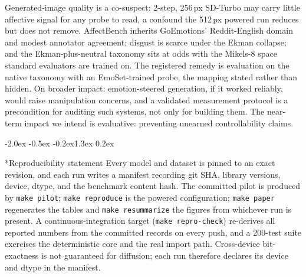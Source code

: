 \documentclass[10pt]{article}
\makeatletter
\renewcommand\section{\@startsection{section}{1}{\z@}%
  {-2.0ex \@plus -0.5ex \@minus -0.2ex}{1.3ex \@plus 0.2ex}{\large\bfseries\raggedright}}
\makeatother
\begin{document}
Generated-image quality is a co-suspect: 2-step, 256\,px SD-Turbo may carry little affective signal for any probe to read, a confound the 512\,px powered run reduces but does not remove. AffectBench inherits GoEmotions' Reddit-English domain and modest annotator agreement; disgust is scarce under the Ekman collapse; and the Ekman-plus-neutral taxonomy sits at odds with the Mikels-8 space standard evaluators are trained on. The registered remedy is evaluation on the native taxonomy with an EmoSet-trained probe, the mapping stated rather than hidden. On broader impact: emotion-steered generation, if it worked reliably, would raise manipulation concerns, and a validated measurement protocol is a precondition for auditing such systems, not only for building them. The near-term impact we intend is evaluative: preventing unearned controllability claims.

\section*{Reproducibility statement}
Every model and dataset is pinned to an exact revision, and each run writes a manifest recording git SHA, library versions, device, dtype, and the benchmark content hash. The committed pilot is produced by \texttt{make pilot}; \texttt{make reproduce} is the powered configuration; \texttt{make paper} regenerates the tables and \texttt{make resummarize} the figures from whichever run is present. A continuous-integration target (\texttt{make repro-check}) re-derives all reported numbers from the committed records on every push, and a 200-test suite exercises the deterministic core and the real import path. Cross-device bit-exactness is not guaranteed for diffusion; each run therefore declares its device and dtype in the manifest.
\end{document}
